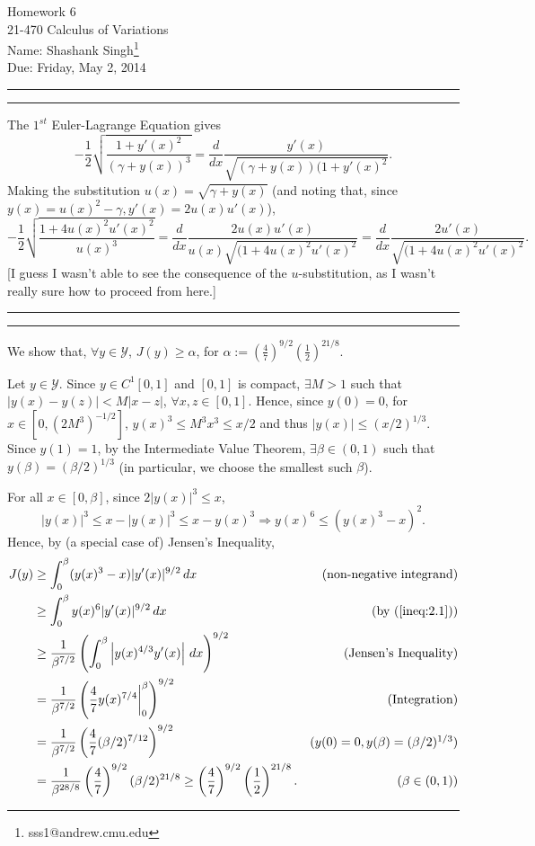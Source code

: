 \documentclass[11pt]{article}
\makeatletter
\newcounter{questionCounter}
\newcounter{partCounter}[questionCounter]
\newenvironment{question}[2][\arabic{questionCounter}]{%
    \setcounter{partCounter}{0}%
    \vspace{.25in} \hrule \vspace{0.5em}%
        \noindent{\bf #2}%
    \vspace{0.8em} \hrule \vspace{.10in}%
    \addtocounter{questionCounter}{1}%
}{}
\newcommand{\myname}{Shashank Singh\footnote{sss1@andrew.cmu.edu}}
\newcommand{\myclass}{21-470 Calculus of Variations}
\newcommand{\myhwnum}{6}
\newcommand{\duedate}{Friday, May 2, 2014}
\newcommand{\Y}{\mathscr{Y}}            %
\makeatother
\begin{document}
\thispagestyle{plain}

{\Large Homework \myhwnum} \\
\myclass \\
Name: \myname \\
Due: \duedate

\begin{question}{Problem 1}
The $1^{st}$ Euler-Lagrange Equation gives
\[-\frac{1}{2}\sqrt{\frac{1 + y'(x)^2}{(\gamma + y(x))^3}}
    = \frac{d}{dx} \frac{y'(x)}{\sqrt{(\gamma + y(x))(1 + y'(x)^2}}.
\]
Making the substitution $u(x) = \sqrt{\gamma + y(x)}$ (and noting that, since
$y(x) = u(x)^2 - \gamma, y'(x) = 2u(x)u'(x)$),
\[-\frac{1}{2}\sqrt{\frac{1 + 4u(x)^2u'(x)^2}{u(x)^3}}
    = \frac{d}{dx} \frac{2u(x)u'(x)}{u(x)\sqrt{(1 + 4u(x)^2u'(x)^2}}
    = \frac{d}{dx} \frac{2u'(x)}{\sqrt{(1 + 4u(x)^2u'(x)^2}}.
\]
[I guess I wasn't able to see the consequence of the $u$-substitution, as I
wasn't really sure how to proceed from here.]
\end{question}

\newpage
\begin{question}{Problem 2}
We show that, $\forall y \in \Y$, $J(y) \geq \alpha$, for
$\alpha := \left( \frac{4}{7} \right)^{9/2}\left( \frac{1}{2} \right)^{21/8}$.

Let $y \in \Y$. Since $y \in C^1[0,1]$ and $[0,1]$ is compact, $\exists M > 1$
such that $|y(x) - y(z)| < M|x - z|$, $\forall x,z \in [0,1]$. Hence, since
$y(0) = 0$, for $x \in [0,(2M^3)^{-1/2}]$, $y(x)^3 \leq M^3x^3 \leq x/2$ and
thus $|y(x)| \leq (x/2)^{1/3}$. Since $y(1) = 1$, by the Intermediate Value
Theorem, $\exists \beta \in (0, 1)$ such that $y(\beta) = (\beta/2)^{1/3}$
(in particular, we choose the smallest such $\beta$).

For all $x \in [0,\beta]$, since $2|y(x)|^3 \leq x$,
\begin{equation}
|y(x)|^3 \leq x - |y(x)|^3 \leq x - y(x)^3
    \Rightarrow y(x)^6 \leq (y(x)^3 - x)^2.
\label{ineq:2.1}
\end{equation}
Hence, by (a special case of) Jensen's Inequality,
\begin{align*}
J(y)
 &  \geq \int_0^\beta (y(x)^3 - x) |y'(x)|^{9/2} \, dx
    & \mbox{(non-negative integrand)}   \\
 &  \geq \int_0^\beta y(x)^6 |y'(x)|^{9/2} \, dx
    & \mbox{(by (\ref{ineq:2.1}))}   \\
 &  \geq \frac{1}{\beta^{7/2}}\left( \int_0^\beta \left| y(x)^{4/3} y'(x) \right| \, dx \right)^{9/2}
    & \mbox{(Jensen's Inequality)}   \\
 &  = \frac{1}{\beta^{7/2}}\left( \frac{4}{7} y(x)^{7/4} \bigg|_0^\beta \right)^{9/2}
    & \mbox{(Integration)}   \\
 &  = \frac{1}{\beta^{7/2}}\left( \frac{4}{7} (\beta/2)^{7/12} \right)^{9/2}
    & \mbox{($y(0) = 0, y(\beta) = (\beta/2)^{1/3}$)}   \\
 &  = \frac{1}{\beta^{28/8}}\left( \frac{4}{7} \right)^{9/2} (\beta/2)^{21/8}
    \geq \left( \frac{4}{7} \right)^{9/2}\left( \frac{1}{2} \right)^{21/8}.
    & \mbox{($\beta \in (0,1)$)}
\end{align*}
\end{question}
\end{document}
